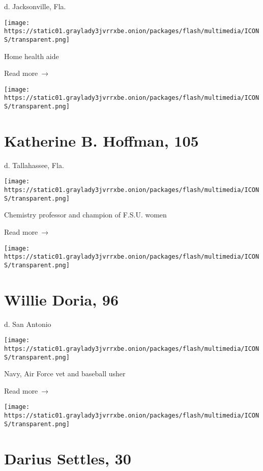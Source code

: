 d. Jacksonville, Fla.

\texttt{[image: https://static01.graylady3jvrrxbe.onion/packages/flash/multimedia/ICONS/transparent.png]}

Home health aide

 Read more~→

\href{https://www.nytimes3xbfgragh.onion/2020/07/29/obituaries/katherine-hoffman-dead-coronavirus.html}{}

\texttt{[image: https://static01.graylady3jvrrxbe.onion/packages/flash/multimedia/ICONS/transparent.png]}

\hypertarget{katherine-b-hoffman-105}{%
\section{Katherine B. Hoffman, 105}\label{katherine-b-hoffman-105}}

d. Tallahassee, Fla.

\texttt{[image: https://static01.graylady3jvrrxbe.onion/packages/flash/multimedia/ICONS/transparent.png]}

Chemistry professor and champion of F.S.U. women

 Read more~→

\href{https://www.nytimes3xbfgragh.onion/2020/07/28/obituaries/willie-doria-dead-coronavirus.html}{}

\texttt{[image: https://static01.graylady3jvrrxbe.onion/packages/flash/multimedia/ICONS/transparent.png]}

\hypertarget{willie-doria-96}{%
\section{Willie Doria, 96}\label{willie-doria-96}}

d. San Antonio

\texttt{[image: https://static01.graylady3jvrrxbe.onion/packages/flash/multimedia/ICONS/transparent.png]}

Navy, Air Force vet and baseball usher

 Read more~→

\href{https://www.nytimes3xbfgragh.onion/2020/07/27/obituaries/darius-settles-dead-coronavirus.html}{}

\texttt{[image: https://static01.graylady3jvrrxbe.onion/packages/flash/multimedia/ICONS/transparent.png]}

\hypertarget{darius-settles-30}{%
\section{Darius Settles, 30}\label{darius-settles-30}}

